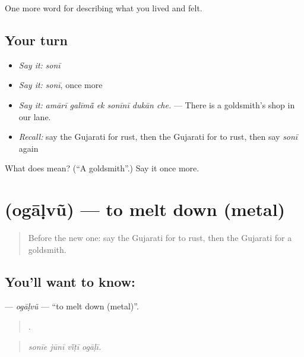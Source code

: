 \begin{grammarlens}[title={What you've built}]
One more word for describing what you lived and felt.
\end{grammarlens}

\subsection*{Your turn}
\begin{itemize}
\raggedright
  \item \emph{Say it:} \emph{sonī}
  \item \emph{Say it:} \emph{sonī}, once more
  \item \emph{Say it:} \emph{amārī galīmā̃ ek sonīnī dukān che.} — There is a goldsmith's shop in our lane.
  \item \emph{Recall:} say the Gujarati for rust, then the Gujarati for to rust, then say \emph{sonī} again
\end{itemize}

\begin{tcolorbox}[breakable,colback=teal!4,colframe=teal!35!black,title={Before you move on}]
What does  mean? (\textquotedblleft{}A goldsmith\textquotedblright{}.) Say it once more.
\end{tcolorbox}
\section[\texorpdfstring{\gu{ઓગાળવું} (ogāḷvũ)}{ઓગાળવું (ogāḷvũ)}]{ (ogāḷvũ) — to melt down (metal)}

\label{lesson:GU-C510-ogaalvu}



\begin{quote}
Before the new one: say the Gujarati for to rust, then the Gujarati for a goldsmith.
\end{quote}

\subsection*{You'll want to know: }
\textbf{} — \emph{ogāḷvũ} — \textquotedblleft{}to melt down (metal)\textquotedblright{}.

\begin{quote}
   .
\end{quote}

\begin{quote}
\emph{sonīe jūnī vī̃ṭī ogāḷī.}
\end{quote}

